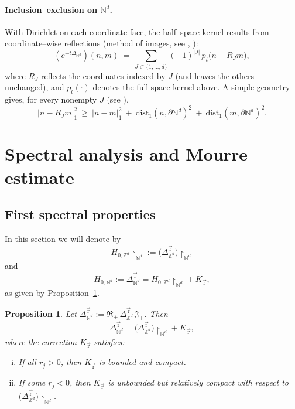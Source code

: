\documentclass[10pt]{amsart}
\newcommand{\Z}{{\mathbb{Z}}}
\newcommand{\N}{{\mathbb{N}}}
\newcommand{\1}{{\mathbb{I}}}
\numberwithin{equation}{section}
\newtheorem{proposition}[theorem]{Proposition}%
\begin{document}
\paragraph{Inclusion--exclusion on $\mathbb{N}^d$.}
With Dirichlet on each coordinate face, the half--space kernel results from
coordinate--wise reflections (method of images, see \cite[Ch.~3]{Davies1989},
\cite{LenzVogt2012}):
\begin{equation}\label{eq:HN-d}
(e^{-t\Delta_{\mathbb{N}^d}})(n,m)
\ =\ \sum_{J\subset\{1,\dots,d\}} (-1)^{|J|}\,
p_t\!\big(n-R_J m\big),
\end{equation}
where $R_J$ reflects the coordinates indexed by $J$ (and leaves the others
unchanged), and $p_t(\cdot)$ denotes the full-space kernel above. A simple
geometry gives, for every nonempty $J$ (see \cite{Delmotte1999}),
\begin{equation}\label{eq:geom-lb}
|n-R_J m|_1^2\ \ge\ |n-m|_1^2\ +\ \mathrm{dist}_1(n,\partial\mathbb{N}^d)^{2}
\ +\ \mathrm{dist}_1(m,\partial\mathbb{N}^d)^{2}.
\end{equation}





\section{Spectral analysis and Mourre estimate}

\subsection{First spectral properties}

In this section we will denote by
\begin{equation}\label{A}
H_{0,\Z^d}\!\restriction_{\N^d} := \big(\Delta^{\vec{\mathrm{r}}}_{\Z^d}\big)\!\restriction_{\N^d}
\end{equation}
and
\begin{equation}\label{B}
H_{0,\N^d} := \Delta^{\vec{\mathrm{r}}}_{\N^d} = H_{0,\Z^d}\!\restriction_{\N^d} + K_{\vec{\mathrm{r}}},
\end{equation}
as given by Proposition~\ref{prop:boundary-correction}.
\begin{proposition}\label{prop:boundary-correction}
Let $\displaystyle \Delta^{\vec{\mathrm{r}}}_{\N^d} := \mathfrak{R}_+\,\Delta^{\vec{\mathrm{r}}}_{\Z^d}\,\mathfrak{J}_+$.
Then
\[
\Delta^{\vec{\mathrm{r}}}_{\N^d} = \big(\Delta^{\vec{\mathrm{r}}}_{\Z^d}\big)\!\restriction_{\N^d} + K_{\vec{\mathrm{r}}},
\]
where the correction $K_{\vec{\mathrm{r}}}$ satisfies:
\begin{enumerate}[(i)]
    \item If all $r_j > 0$, then $K_{\vec{\mathrm{r}}}$ is bounded and compact.
    \item If some $r_j < 0$, then $K_{\vec{\mathrm{r}}}$ is unbounded but relatively compact with respect to $\big(\Delta^{\vec{\mathrm{r}}}_{\Z^d}\big)\!\restriction_{\N^d}$.
\end{enumerate}
\end{proposition}
\end{document}
